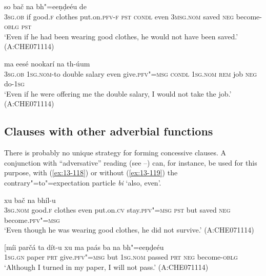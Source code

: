 \begin{exe}
\ex
\label{ex:13-116}
 so bač na bh"=eeṇḍeéu de  \\
\textsc{3sg.ob} if good.\textsc{f} clothes put.on.\textsc{pfv-f} \textsc{pst} \textsc{condl}  even \textsc{3msg.nom} saved \textsc{neg} become-\textsc{oblg} \textsc{pst} \\
\glt `Even if he had been wearing good clothes, he would not have been saved.' (A:CHE071114)

\ex
\label{ex:13-117}
 ma eesé nookarí na th-úum \\
\textsc{3sg.ob} \textsc{1sg.nom}-to double salary even give.\textsc{pfv"=msg}  \textsc{condl } \textsc{1sg.nom} \textsc{rem} job \textsc{neg} do-\textsc{1sg} \\
\glt `Even if he were offering me the double salary, I would not take the job.' (A:CHE071114)
\end{exe}

\subsection{Clauses with other adverbial functions}
\label{subsec:13-4-5}

 There is probably no unique strategy for forming concessive clauses. A conjunction with ``adversative'' reading (see --) can, for instance, be used for this purpose, with (\ref{ex:13-118}) or without (\ref{ex:13-119}) the contrary"=to"=expectation particle \textit{bi} `also, even'. 

\begin{exe}
\ex
\label{ex:13-118}
 xu bač na bhíl-u  \\
\textsc{3sg.nom} good.\textsc{f} clothes even put.on.\textsc{cv}  stay.\textsc{pfv"=msg } \textsc{pst} but saved \textsc{neg} become.\textsc{pfv"=msg} \\
\glt `Even though he was wearing good clothes, he did not survive.' (A:CHE071114)

\ex
\label{ex:13-119}
\gll [míi parčá ta dít-u xu ma paás  ba na bh"=eeṇḍeéu \\
\textsc{1sg.gn} paper \textsc{prt} give.\textsc{pfv"=msg} but \textsc{1sg.nom} passed \textsc{prt} \textsc{neg} become-\textsc{oblg} \\
\glt `Although I turned in my paper, I will not pass.' (A:CHE071114) 
\end{exe}

